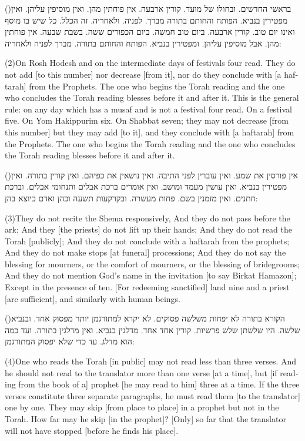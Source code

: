 \documentclass[12pt, openany]{book}
\newcommand{\sethebfont}{
\fontsize{10.5pt}{13.1pt} \selectfont
}
\newcommand{\hebeng}[2]{
	{\sethebfont #1\\}
	
	\begin{english}
		#2
	\end{english}
}
\newcommand{\vsnum}[1]{(\hebrewnumeral{#1})\space}
\newcommand{\vsnumeng}[1]{(#1)\space}
\begin{document}
\hebeng{\vsnum{2}בראשי החדשים. ובחולו של מועד. קורין ארבעה. אין פוחתין מהן. ואין מוסיפין עליהן. ואין מפטירין בנביא. הפותח והחותם בתורה מברך. לפניה. ולאחריה. זה הכלל. כל שיש בו מוסף ואינו יום טוב. קורין ארבעה. ביום טוב חמשה. ביום הכפורים ששה. בשבת שבעה. אין פוחתין מהן. אבל מוסיפין עליהן. ומפטירין בנביא. הפותח והחותם בתורה. מברך לפניה ולאחריה: }{\vsnumeng{2}On Rosh Hodesh and on the intermediate days of festivals four read. They do not add {[to this number]} nor decrease {[from it]}, nor do they conclude with {[a haftarah]} from the Prophets. The one who begins the Torah reading and the one who concludes the Torah reading blesses before it and after it. This is the general rule: on any day which has a musaf and is not a festival four read. On a festival five. On Yom Hakippurim six. On Shabbat seven; they may not decrease {[from this number]} but they may add {[to it]}, and they conclude with {[a haftarah]} from the Prophets. The one who begins the Torah reading and the one who concludes the Torah reading blesses before it and after it.}%

\hebeng{\vsnum{3}אין פורסין את שמע. ואין עוברין לפני התיבה. ואין נושאין את כפיהם. ואין קורין בתורה. ואין מפטירין בנביא. ואין עושין מעמד ומושב. ואין אומרים ברכת אבלים ותנחומי אבלים. וברכת חתנים. ואין מזמנין בשם. פחות מעשרה. ובקרקעות תשעה וכהן ואדם כיוצא בהן: }{\vsnumeng{3}They do not recite the Shema responsively, And they do not pass before the ark; And they {[the priests]} do not lift up their hands; And they do not read the Torah {[publicly]}; And they do not conclude with a haftarah from the prophets; And they do not make stops {[at funeral]} processions; And they do not say the blessing for mourners, or the comfort of mourners, or the blessing of bridegrooms; And they do not mention God’s name in the invitation {[to say Birkat Hamazon]}; Except in the presence of ten. {[For redeeming sanctified]} land nine and a priest {[are sufficient]}, and similarly with human beings.}%

\hebeng{\vsnum{4}הקורא בתורה לא יפחות משלשה פסוקים. לא יקרא למתורגמן יותר מפסוק אחד. ובנביא שלשה. היו שלשתן שלש פרשיות. קורין אחד אחד. מדלגין בנביא. ואין מדלגין בתורה. ועד כמה הוא מדלג. עד כדי שלא יפסוק המתורגמן: }{\vsnumeng{4}One who reads the Torah {[in public]} may not read less than three verses. And he should not read to the translator more than one verse {[at a time]}, but {[if reading from the book of a]} prophet {[he may read to him]} three at a time. If the three verses constitute three separate paragraphs, he must read them {[to the translator]} one by one. They may skip {[from place to place]} in a prophet but not in the Torah. How far may he skip {[in the prophet]}? {[Only]} so far that the translator will not have stopped {[before he finds his place]}.}%
\end{document}
